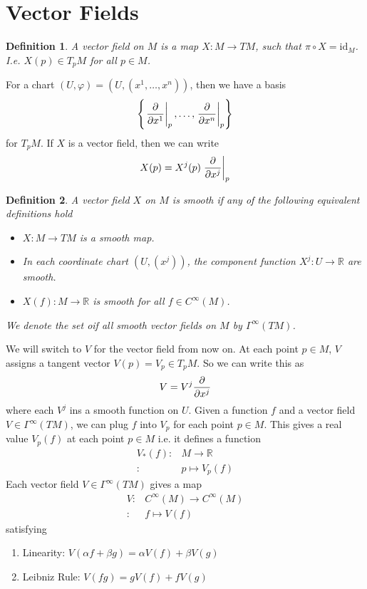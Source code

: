 \documentclass[a4paper]{article}
\newtheorem*{defn}{Definition}
\begin{document}
\section*{Vector Fields}%

\begin{defn}
  A vector field on $M$ is a map $X: M \rightarrow TM$, such that $\pi \circ X = \text{id}_M$. I.e. $X(p) \in T_pM$ for all $p \in M$.
\end{defn}

For a chart $(U, \varphi) = (U, (x^1, \dots, x^n))$, then we have a basis 
\[
  \left\{ \eval{\pdv{}{x^1}}_p, \dots, \eval{\pdv{}{x^n}}_p \right\}
\]
for $T_pM$. If $X$ is a vector field, then we can write
\[
  X(p) = X^j(p) \eval{\pdv{}{x^j}}_p
\]

\begin{defn}
  A vector field $X$ on $M$ is smooth if any of the following equivalent definitions hold
  \begin{itemize}
    \item $X: M \rightarrow TM$ is a smooth map.
    \item In each coordinate chart $(U, (x^j))$, the component function $X^j: U \rightarrow \mathds{R}$ are smooth.
    \item $X (f): M \rightarrow \mathds{R}$ is smooth for all $f \in C^{\infty}(M)$.
  \end{itemize}
We denote the set oif all smooth vector fields on $M$ by $\Gamma^{\infty}(TM)$.
\end{defn}

We will switch to $V$ for the vector field from now on. At each point $p \in M$, $V$ assigns a tangent vector $V(p) = V_p \in T_pM$. So we can write this as 
\[
  V = V^j \pdv{}{x^j}
\]
where each $V^j$ ins a smooth function on $U$. Given a function $f$ and a vector field $V \in \Gamma^{\infty}(TM)$, we can plug $f$ into $V_p$ for each point $p \in M$. This gives a real value $V_p(f)$ at each point $p \in M$ i.e. it defines a function 
\[
  \begin{aligned}
    V_*(f):& M \rightarrow \mathds{R} \\
    :& p \mapsto V_p(f)
  \end{aligned}
\]
Each vector field $V \in \Gamma^{\infty}(TM)$ gives a map
\[
  \begin{aligned}
    V:& C^{\infty}(M) \rightarrow C^{\infty}(M) \\
    :& f \mapsto V(f)
  \end{aligned}
\]
satisfying
\begin{enumerate}
  \item Linearity: $V(\alpha f + \beta g) = \alpha V(f) + \beta V(g)$ 
  \item Leibniz Rule: $V(fg) = gV(f) + fV(g)$
\end{enumerate}
\end{document}
